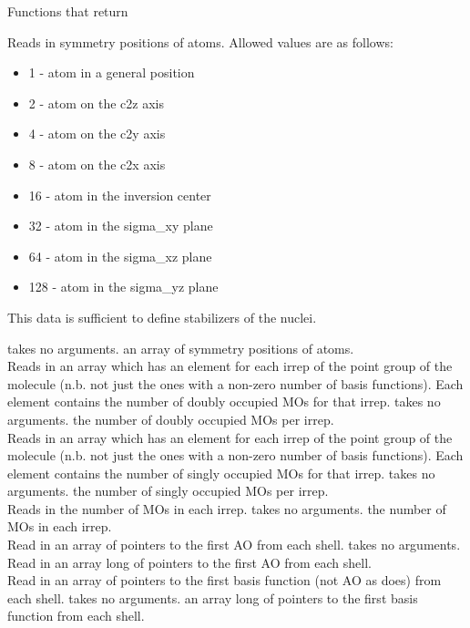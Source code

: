 \begin{center}
Functions that return 
\end{center}
{Reads in symmetry positions of atoms.
Allowed values are as follows:
\begin{itemize}
\item 1   - atom in a general position
\item 2   - atom on the c2z axis
\item 4   - atom on the c2y axis
\item 8   - atom on the c2x axis
\item 16  - atom in the inversion center
\item 32  - atom in the sigma\_xy plane
\item 64  - atom in the sigma\_xz plane
\item 128 - atom in the sigma\_yz plane
\end{itemize}
This data is sufficient to define stabilizers of the nuclei.}
{takes no arguments.}
{an array of symmetry positions of atoms.} \\
{Reads in an array which has an element for each irrep of the
point group of the molecule (n.b. not just the ones
with a non-zero number of basis functions). Each element
contains the number of doubly occupied MOs for that irrep.}
{takes no arguments.}
{the number of doubly occupied MOs per irrep.} \\
{Reads in an array which has an element for each irrep of the
point group of the molecule (n.b. not just the ones
with a non-zero number of basis functions).  Each element
contains the number of singly occupied MOs for that irrep.}
{takes no arguments.}
{the number of singly occupied MOs per irrep.} \\
{Reads in the number of MOs in each irrep.}
{takes no arguments.}
{the number of MOs in each irrep.} \\
{Read in an array of pointers to the first AO
from each shell.}
{takes no arguments.}
{Read in an array  long of pointers to
the first AO from each shell.} \\
{Read in an array of pointers to the first basis
function (not AO as  does)
from each shell.}
{takes no arguments.}
{an array  long of pointers to
the first basis function from each shell.} \\
